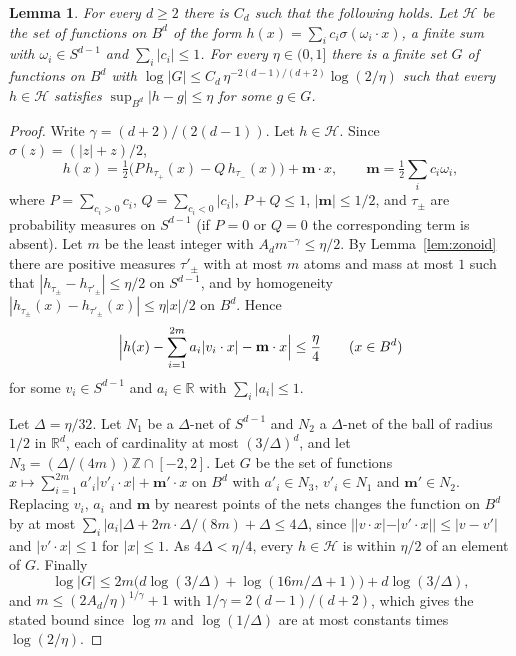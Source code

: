 \documentclass[11pt]{amsart}
\newtheorem{lemma}[theorem]{Lemma}
\theoremstyle{definition}
\theoremstyle{remark}
\numberwithin{equation}{section}
\newcommand{\RR}{\mathbb{R}}
\begin{document}
\begin{lemma}\label{lem:Hcover}
For every $d\ge2$ there is $C_d$ such that the following holds. Let $\mathcal H$ be the set of functions on $B^d$ of the form $h(x)=\sum_ic_i\sigma(\omega_i\cdot x)$, a finite sum with $\omega_i\in S^{d-1}$ and $\sum_i|c_i|\le1$. For every $\eta\in(0,1]$ there is a finite set $G$ of functions on $B^d$ with $\log|G|\le C_d\,\eta^{-2(d-1)/(d+2)}\log(2/\eta)$ such that every $h\in\mathcal H$ satisfies $\sup_{B^d}|h-g|\le\eta$ for some $g\in G$.
\end{lemma}

\begin{proof}
Write $\gamma=(d+2)/(2(d-1))$. Let $h\in\mathcal H$. Since $\sigma(z)=(|z|+z)/2$,
\[
h(x)=\tfrac12\bigl(P\,h_{\tau_+}(x)-Q\,h_{\tau_-}(x)\bigr)+\mathbf m\cdot x,\qquad \mathbf m=\tfrac12\sum_ic_i\omega_i,
\]
where $P=\sum_{c_i>0}c_i$, $Q=\sum_{c_i<0}|c_i|$, $P+Q\le1$, $|\mathbf m|\le1/2$, and $\tau_\pm$ are probability measures on $S^{d-1}$ (if $P=0$ or $Q=0$ the corresponding term is absent). Let $m$ be the least integer with $A_dm^{-\gamma}\le\eta/2$. By Lemma~\ref{lem:zonoid} there are positive measures $\tau'_\pm$ with at most $m$ atoms and mass at most $1$ such that $|h_{\tau_\pm}-h_{\tau'_\pm}|\le\eta/2$ on $S^{d-1}$, and by homogeneity $|h_{\tau_\pm}(x)-h_{\tau'_\pm}(x)|\le\eta|x|/2$ on $B^d$. Hence
\[
\Bigl|h(x)-\sum_{i=1}^{2m}a_i|v_i\cdot x|-\mathbf m\cdot x\Bigr|\le\frac\eta4\qquad(x\in B^d)
\]
for some $v_i\in S^{d-1}$ and $a_i\in\RR$ with $\sum_i|a_i|\le1$.

Let $\Delta=\eta/32$. Let $N_1$ be a $\Delta$-net of $S^{d-1}$ and $N_2$ a $\Delta$-net of the ball of radius $1/2$ in $\RR^d$, each of cardinality at most $(3/\Delta)^d$, and let $N_3=(\Delta/(4m))\mathbb Z\cap[-2,2]$. Let $G$ be the set of functions $x\mapsto\sum_{i=1}^{2m}a'_i|v'_i\cdot x|+\mathbf m'\cdot x$ on $B^d$ with $a'_i\in N_3$, $v'_i\in N_1$ and $\mathbf m'\in N_2$. Replacing $v_i$, $a_i$ and $\mathbf m$ by nearest points of the nets changes the function on $B^d$ by at most $\sum_i|a_i|\Delta+2m\cdot\Delta/(8m)+\Delta\le4\Delta$, since $||v\cdot x|-|v'\cdot x||\le|v-v'|$ and $|v'\cdot x|\le1$ for $|x|\le1$. As $4\Delta<\eta/4$, every $h\in\mathcal H$ is within $\eta/2$ of an element of $G$. Finally
\[
\log|G|\le2m\bigl(d\log(3/\Delta)+\log(16m/\Delta+1)\bigr)+d\log(3/\Delta),
\]
and $m\le(2A_d/\eta)^{1/\gamma}+1$ with $1/\gamma=2(d-1)/(d+2)$, which gives the stated bound since $\log m$ and $\log(1/\Delta)$ are at most constants times $\log(2/\eta)$.
\end{proof}
\end{document}
